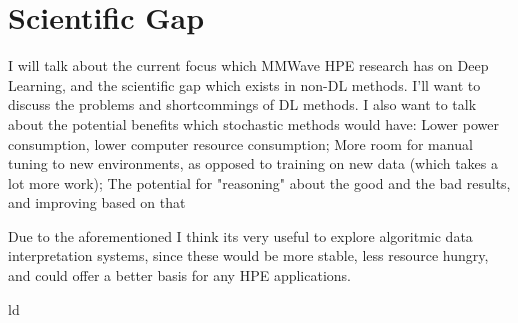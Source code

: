 \section{Scientific Gap}
\label{section: introduction - scientific gap}


I will talk about the current focus which MMWave HPE research has on Deep Learning, and the scientific gap which exists in non-DL methods.
I'll want to discuss the problems and shortcommings of DL methods.
I also want to talk about the potential benefits which stochastic methods would have: 
Lower power consumption, lower computer resource consumption; 
More room for manual tuning to new environments, as opposed to training on new data (which takes a lot more work); 
The potential for "reasoning" about the good and the bad results, and improving based on that

Due to the aforementioned I think its very useful to explore algoritmic data interpretation systems, since these would be more stable, less resource hungry, and could offer a better basis for any HPE applications.

ld 
